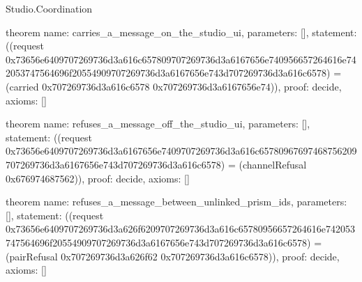 \begin{lexlean}{Studio.Coordination}
\begin{semanticmodule}
theorem{
  name: carries_a_message_on_the_studio_ui,
  parameters: [],
  statement: ((request 0x73656e6409707269736d3a616c657809707269736d3a6167656e740956657264616e742053747564696f20554909707269736d3a6167656e743d707269736d3a616c6578) = (carried 0x707269736d3a616c6578 0x707269736d3a6167656e74)),
  proof: decide{},
  axioms: []
}

theorem{
  name: refuses_a_message_off_the_studio_ui,
  parameters: [],
  statement: ((request 0x73656e6409707269736d3a6167656e7409707269736d3a616c65780967697468756209707269736d3a6167656e743d707269736d3a616c6578) = (channelRefusal 0x676974687562)),
  proof: decide{},
  axioms: []
}

theorem{
  name: refuses_a_message_between_unlinked_prism_ids,
  parameters: [],
  statement: ((request 0x73656e6409707269736d3a626f6209707269736d3a616c65780956657264616e742053747564696f20554909707269736d3a6167656e743d707269736d3a616c6578) = (pairRefusal 0x707269736d3a626f62 0x707269736d3a616c6578)),
  proof: decide{},
  axioms: []
}
\end{semanticmodule}
\end{lexlean}
